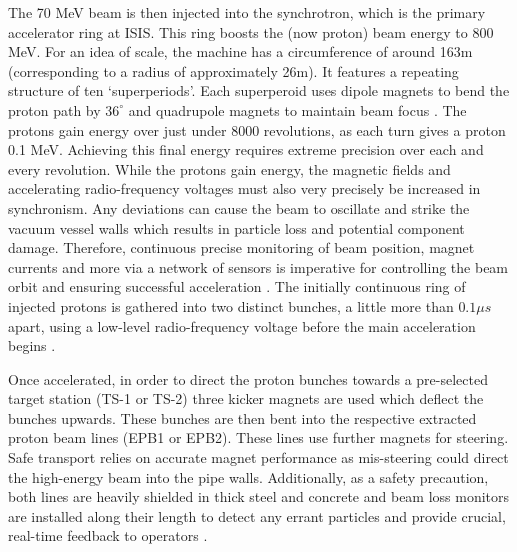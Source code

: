 \documentclass[10pt,oneside]{report}
\begin{document}
The 70 MeV beam is then injected into the synchrotron, which is the primary accelerator ring at ISIS. This ring boosts the (now proton) beam energy to 800 MeV. For an idea of scale, the machine has a circumference of around 163m (corresponding to a radius of approximately 26m). It features a repeating structure of ten `superperiods'. Each superperoid uses dipole magnets to bend the proton path by $36^\circ$ and quadrupole magnets to maintain beam focus \cite{2021practicalguide}. The protons gain energy over just under 8000 revolutions, as each turn gives a proton 0.1 MeV. Achieving this final energy requires extreme precision over each and every revolution. While the protons gain energy, the magnetic fields and accelerating radio-frequency voltages must also very precisely be increased in synchronism. Any deviations can cause the beam to oscillate and strike the vacuum vessel walls which results in particle loss and potential component damage. Therefore, continuous precise monitoring of beam position, magnet currents and more via a network of sensors is imperative for controlling the beam orbit and ensuring successful acceleration \cite{2021practicalguide}. The initially continuous ring of injected protons is gathered into two distinct bunches, a little more than $0.1\mu s$ apart, using a low-level radio-frequency voltage before the main acceleration begins \cite{2021practicalguide}.

Once accelerated, in order to direct the proton bunches towards a pre-selected target station (TS-1 or TS-2) three kicker magnets are used which deflect the bunches upwards. These bunches are then bent into the respective extracted proton beam lines (EPB1 or EPB2). These lines use further magnets for steering. Safe transport relies on accurate magnet performance as mis-steering could direct the high-energy beam into the pipe walls. Additionally, as a safety precaution, both lines are heavily shielded in thick steel and concrete and beam loss monitors are installed along their length to detect any errant particles and provide crucial, real-time feedback to operators \cite{2021practicalguide}.
\end{document}
